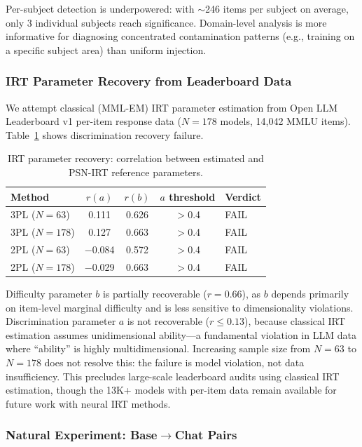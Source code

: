 \documentclass[11pt]{article}
\begin{document}
Per-subject detection is underpowered: with $\sim$246 items per subject on average, only 3 individual subjects reach significance. Domain-level analysis is more informative for diagnosing concentrated contamination patterns (e.g., training on a specific subject area) than uniform injection.

\subsubsection{IRT Parameter Recovery from Leaderboard Data}

We attempt classical (MML-EM) IRT parameter estimation from Open LLM Leaderboard v1 per-item response data ($N=178$ models, 14,042 MMLU items). Table~\ref{tab:irt_refit} shows discrimination recovery failure.

\begin{table}[h]
\centering
\caption{IRT parameter recovery: correlation between estimated and PSN-IRT reference parameters.}
\label{tab:irt_refit}
\begin{tabular}{lcccl}
\toprule
Method & $r(a)$ & $r(b)$ & $a$ threshold & Verdict \\
\midrule
3PL ($N=63$) & 0.111 & 0.626 & $>$0.4 & FAIL \\
3PL ($N=178$) & 0.127 & 0.663 & $>$0.4 & FAIL \\
2PL ($N=63$) & $-$0.084 & 0.572 & $>$0.4 & FAIL \\
2PL ($N=178$) & $-$0.029 & 0.663 & $>$0.4 & FAIL \\
\bottomrule
\end{tabular}
\end{table}

Difficulty parameter $b$ is partially recoverable ($r = 0.66$), as $b$ depends primarily on item-level marginal difficulty and is less sensitive to dimensionality violations. Discrimination parameter $a$ is not recoverable ($r \leq 0.13$), because classical IRT estimation assumes unidimensional ability---a fundamental violation in LLM data where ``ability'' is highly multidimensional. Increasing sample size from $N=63$ to $N=178$ does not resolve this: the failure is model violation, not data insufficiency. This precludes large-scale leaderboard audits using classical IRT estimation, though the 13K+ models with per-item data remain available for future work with neural IRT methods.

\subsubsection{Natural Experiment: Base$\to$Chat Pairs}
\end{document}

